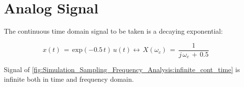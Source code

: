 \newpage
\section{Analog Signal}

The continuous time domain signal to be taken is a decaying exponential:

\begin{equation}
x(t) \, = \, \text{exp}(-0.5 \, t) \, u(t) \leftrightarrow \, X(\omega_c) \, = \, \displaystyle\frac{1}{j \, \omega_c\, + \, 0.5}
\label{fig:Simulation_Sampling_Frequency_Analysis:infinite_cont_time}
\end{equation}

Signal of \autoref{fig:Simulation_Sampling_Frequency_Analysis:infinite_cont_time} is infinite both in time and frequency domain.

